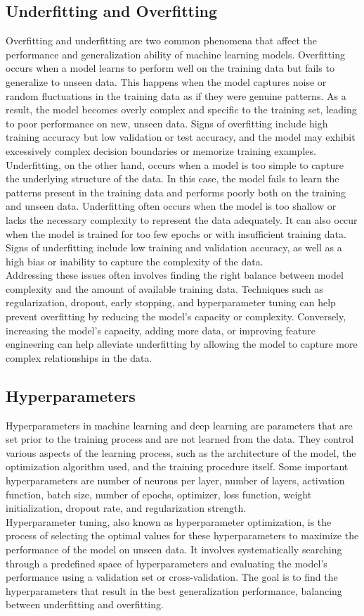 \subsection{Underfitting and Overfitting}
Overfitting and underfitting are two common phenomena that affect the performance and generalization ability of machine learning models. Overfitting occurs when a model learns to perform well on the training data but fails to generalize to unseen data. This happens when the model captures noise or random fluctuations in the training data as if they were genuine patterns. As a result, the model becomes overly complex and specific to the training set, leading to poor performance on new, unseen data. Signs of overfitting include high training accuracy but low validation or test accuracy, and the model may exhibit excessively complex decision boundaries or memorize training examples. \\
Underfitting, on the other hand, occurs when a model is too simple to capture the underlying structure of the data. In this case, the model fails to learn the patterns present in the training data and performs poorly both on the training and unseen data. Underfitting often occurs when the model is too shallow or lacks the necessary complexity to represent the data adequately. It can also occur when the model is trained for too few epochs or with insufficient training data. Signs of underfitting include low training and validation accuracy, as well as a high bias or inability to capture the complexity of the data.\\
Addressing these issues often involves finding the right balance between model complexity and the amount of available training data. Techniques such as regularization, dropout, early stopping, and hyperparameter tuning can help prevent overfitting by reducing the model's capacity or complexity. Conversely, increasing the model's capacity, adding more data, or improving feature engineering can help alleviate underfitting by allowing the model to capture more complex relationships in the data.
\subsection{Hyperparameters}\label{section:hyperparameters}
Hyperparameters in machine learning and deep learning are parameters that are set prior to the training process and are not learned from the data. They control various aspects of the learning process, such as the architecture of the model, the optimization algorithm used, and the training procedure itself. Some important hyperparameters are number of neurons per layer, number of layers, activation function, batch size, number of epochs, optimizer, loss function, weight initialization, dropout rate, and regularization strength. \\
Hyperparameter tuning, also known as hyperparameter optimization, is the process of selecting the optimal values for these hyperparameters to maximize the performance of the model on unseen data. It involves systematically searching through a predefined space of hyperparameters and evaluating the model's performance using a validation set or cross-validation. The goal is to find the hyperparameters that result in the best generalization performance, balancing between underfitting and overfitting.
